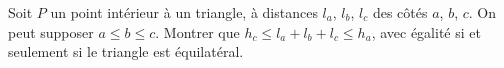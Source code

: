 Soit $P$ un point intérieur à un triangle, à distances $l_a$, $l_b$, $l_c$ des côtés $a$, $b$, $c$. On peut supposer $a \leq b \leq c$. Montrer que $h_c \leq l_a + l_b + l_c \leq h_a$, avec égalité si et seulement si le triangle est équilatéral.
